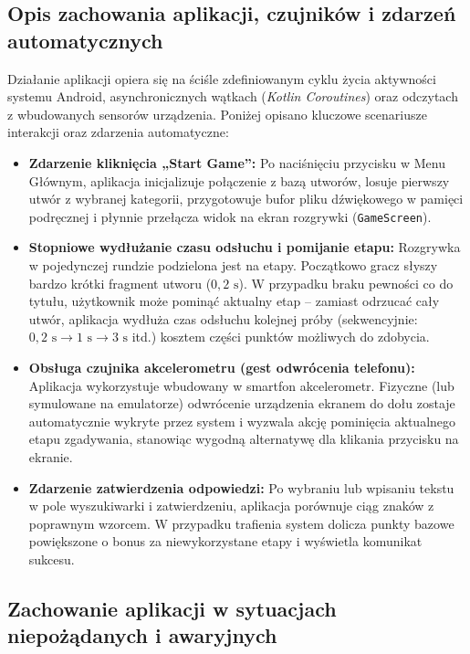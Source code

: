 \subsection{Opis zachowania aplikacji, czujników i zdarzeń automatycznych}

\hspace{0.60cm}Działanie aplikacji opiera się na ściśle zdefiniowanym cyklu życia aktywności systemu Android, asynchronicznych wątkach (\textit{Kotlin Coroutines}) oraz odczytach z wbudowanych sensorów urządzenia. Poniżej opisano kluczowe scenariusze interakcji oraz zdarzenia automatyczne:

\begin{itemize}
    \item \textbf{Zdarzenie kliknięcia „Start Game”:} Po naciśnięciu przycisku w Menu Głównym, aplikacja inicjalizuje połączenie z bazą utworów, losuje pierwszy utwór z wybranej kategorii, przygotowuje bufor pliku dźwiękowego w pamięci podręcznej i płynnie przełącza widok na ekran rozgrywki (\texttt{GameScreen}).
    \item \textbf{Stopniowe wydłużanie czasu odsłuchu i pomijanie etapu:} Rozgrywka w pojedynczej rundzie podzielona jest na etapy. Początkowo gracz słyszy bardzo krótki fragment utworu ($0,2\text{ s}$). W przypadku braku pewności co do tytułu, użytkownik może pominąć aktualny etap – zamiast odrzucać cały utwór, aplikacja wydłuża czas odsłuchu kolejnej próby (sekwencyjnie: $0,2\text{ s} \rightarrow 1\text{ s} \rightarrow 3\text{ s}$ itd.) kosztem części punktów możliwych do zdobycia.
    \item \textbf{Obsługa czujnika akcelerometru (gest odwrócenia telefonu):} Aplikacja wykorzystuje wbudowany w smartfon akcelerometr. Fizyczne (lub symulowane na emulatorze) odwrócenie urządzenia ekranem do dołu zostaje automatycznie wykryte przez system i wyzwala akcję pominięcia aktualnego etapu zgadywania, stanowiąc wygodną alternatywę dla klikania przycisku na ekranie.
    \item \textbf{Zdarzenie zatwierdzenia odpowiedzi:} Po wybraniu lub wpisaniu tekstu w pole wyszukiwarki i zatwierdzeniu, aplikacja porównuje ciąg znaków z poprawnym wzorcem. W przypadku trafienia system dolicza punkty bazowe powiększone o bonus za niewykorzystane etapy i wyświetla komunikat sukcesu.
\end{itemize}

\subsection{Zachowanie aplikacji w sytuacjach niepożądanych i awaryjnych}

